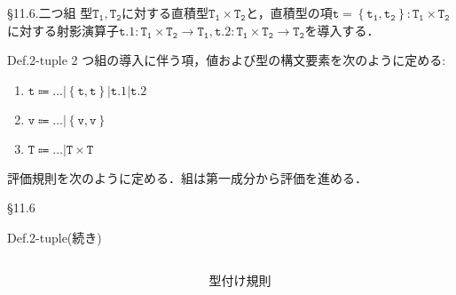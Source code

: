 \documentclass[9pt]{beamer}
\begin{document}
\begin{frame}{\S11.6.二つ組}
型$\mathtt{T_{1}, T_{2}}$に対する直積型$\mathtt{T_{1}\times T_{2}}$と，直積型の項$\mathtt{t = \left\{t_{1},t_{2}\right\}:T_{1}\times T_{2}}$に対する射影演算子$\mathtt{t.1:T_{1}\times T_{2}\to T_{1}},\mathtt{t.2:T_{1}\times T_{2}\to T_{2}}$を導入する．
\begin{alertblock}{Def.2-tuple}
2 つ組の導入に伴う項，値および型の構文要素を次のように定める:\begin{enumerate}
\item $\mathtt{t\Coloneq\ldots|\left\{t, t\right\}|t.1|t.2}$
\item $\mathtt{v\Coloneq\ldots|\left\{v,v\right\}}$
\item $\mathtt{T\Coloneq\ldots|T\times T}$
\end{enumerate}
評価規則を次のように定める．組は第一成分から評価を進める．
\end{alertblock}\end{frame}
\begin{frame}{\S11.6}
\begin{alertblock}{Def.2-tuple(続き)}
\begin{columns}
\begin{column}{0.5\columnwidth}
\end{column}
\begin{column}{0.5\columnwidth}
型付け規則
\end{column}
\end{columns}
\end{alertblock}
\end{frame}
\end{document}
